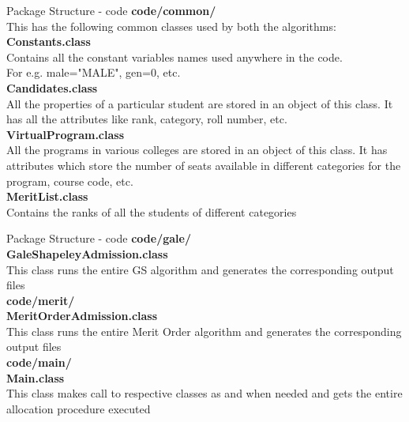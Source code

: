 \documentclass{beamer}
\begin{document}
\begin{frame}[t]{Package Structure - code}
\pause
\textbf{code/common/} \\
This has the following common classes used by both the algorithms:  \\
\pause
\textbf{Constants.class}  \\
Contains all the constant variables names used anywhere in the code.  \\
For e.g. male="MALE", gen=0, etc. \\
\pause
\textbf{Candidates.class} \\
All the properties of a particular student are stored in an object of this class. It has all the attributes like rank, category, roll number, etc.  \\
\pause
\textbf{VirtualProgram.class} \\
All the programs in various colleges are stored in an object of this class. It has attributes which store the number of seats available in different categories for the program, course code, etc.\\
\pause
\textbf{MeritList.class}  \\
Contains the ranks of all the students of different categories\\
\end{frame}
\begin{frame}[t]{Package Structure - code}
\textbf{code/gale/} \\
\pause
\textbf{GaleShapeleyAdmission.class} \\
This class runs the entire GS algorithm and generates the corresponding output files\\
\pause
\textbf{code/merit/} \\
\textbf{MeritOrderAdmission.class}\\
This class runs the entire Merit Order algorithm and generates the corresponding output files\\
\pause
\textbf{code/main/} \\
\textbf{Main.class} \\
This class makes call to respective classes as and when needed and gets the entire allocation procedure executed\\
\end{frame}
\end{document}
